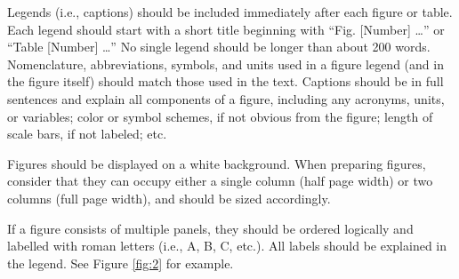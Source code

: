 \documentclass{article}
\begin{document}
Legends (i.e., captions) should be included immediately after each figure or table. Each legend should start with a short title beginning with “Fig. [Number] …” or “Table [Number] …” No single legend should be longer than about 200 words. Nomenclature, abbreviations, symbols, and units used in a figure legend (and in the figure itself) should match those used in the text. Captions should be in full sentences and explain all components of a figure, including any acronyms, units, or variables; color or symbol schemes, if not obvious from the figure; length of scale bars, if not labeled; etc.

Figures should be displayed on a white background. When preparing figures, consider that they can occupy either a single column (half page width) or two columns (full page width), and should be sized accordingly.

If a figure consists of multiple panels, they should be ordered logically and labelled with roman letters (i.e., A, B, C, etc.). All labels should be explained in the legend. See Figure \ref{fig:2} for example.
\end{document}
